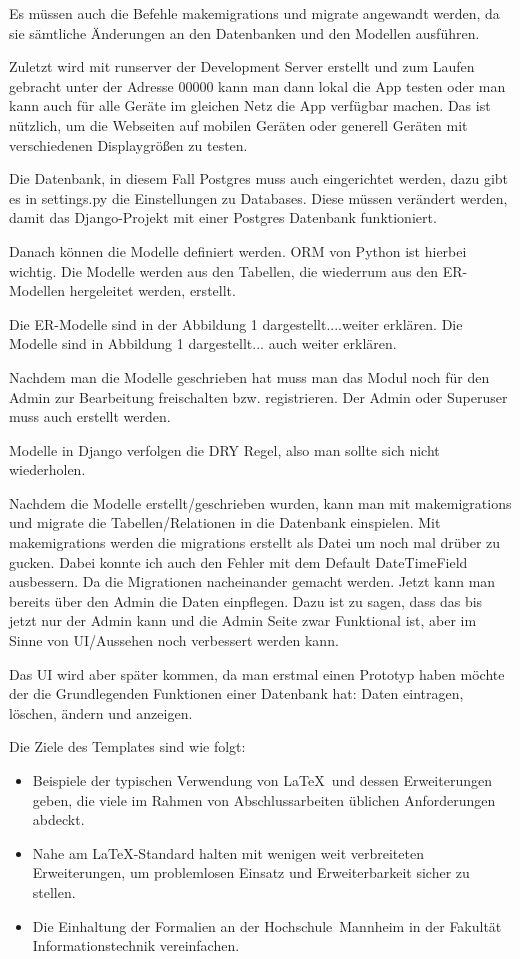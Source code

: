 \documentclass[11pt,a4paper]{report}
\begin{document}
Es müssen auch die Befehle makemigrations und migrate angewandt werden, da sie sämtliche Änderungen an den Datenbanken und den Modellen ausführen. 

Zuletzt wird mit runserver der Development Server erstellt und zum Laufen gebracht unter der Adresse 00000 kann man dann lokal die App testen oder man kann auch für alle Geräte im gleichen Netz die App verfügbar machen. Das ist nützlich, um die Webseiten auf mobilen Geräten oder generell Geräten mit verschiedenen Displaygrößen zu testen.

Die Datenbank, in diesem Fall Postgres muss auch eingerichtet werden, dazu gibt es in settings.py die Einstellungen zu Databases. Diese müssen verändert werden, damit das Django-Projekt mit einer Postgres Datenbank funktioniert. 

Danach können die Modelle definiert werden. ORM von Python ist hierbei wichtig. Die Modelle werden aus den Tabellen, die wiederrum aus den ER-Modellen hergeleitet werden, erstellt.

Die ER-Modelle sind in der Abbildung 1 dargestellt....weiter erklären. Die Modelle sind in Abbildung 1 dargestellt... auch weiter erklären.

Nachdem man die Modelle geschrieben hat muss man das Modul noch für den Admin zur Bearbeitung freischalten bzw. registrieren. Der Admin oder Superuser muss auch erstellt werden.

Modelle in Django verfolgen die DRY Regel, also man sollte sich nicht wiederholen.

Nachdem die Modelle erstellt/geschrieben wurden, kann man mit makemigrations und migrate die Tabellen/Relationen in die Datenbank einspielen. Mit makemigrations werden die migrations erstellt als Datei um noch mal drüber zu gucken. Dabei konnte ich auch den Fehler mit dem Default DateTimeField ausbessern. Da die Migrationen nacheinander gemacht werden. Jetzt kann man bereits über den Admin die Daten einpflegen. Dazu ist zu sagen, dass das bis jetzt nur der Admin kann und die Admin Seite zwar Funktional ist, aber im Sinne von UI/Aussehen noch verbessert werden kann.

Das UI wird aber später kommen, da man erstmal einen Prototyp haben möchte der die Grundlegenden Funktionen einer  Datenbank hat: Daten eintragen, löschen, ändern und anzeigen.






Die Ziele des Templates sind wie folgt:
\begin{itemize}
\item Beispiele der typischen Verwendung von \LaTeX\ und dessen Erweiterungen 
  geben, die viele im Rahmen von Abschlussarbeiten üblichen Anforderungen 
  abdeckt.
\item Nahe am \LaTeX-Standard halten mit wenigen weit verbreiteten 
  Erweiterungen, um problemlosen Einsatz und Erweiterbarkeit sicher zu stellen.
\item Die Einhaltung der Formalien an der Hochschule~Mannheim in der
  Fakultät Informationstechnik vereinfachen.
\end{itemize}
\end{document}
